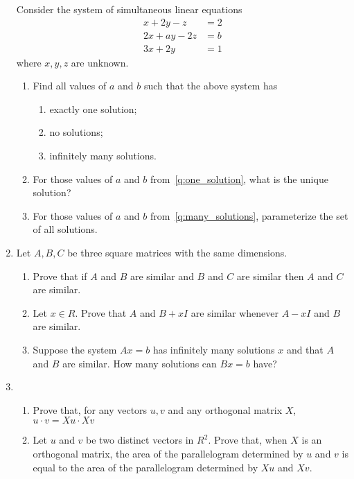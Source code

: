 \documentclass{article}
\begin{document}
\begin{enumerate}
Consider the system of simultaneous linear equations
\begin{align*}
  x + 2y -  z &= 2 \\
 2x + ay - 2z &= b \\
 3x + 2y      &= 1
\end{align*}
where $x, y, z$ are unknown.

\begin{enumerate}
\item Find all values of $a$ and $b$ such that the above system has
\begin{enumerate}
\item \label{q:one_solution} exactly one solution;
\item no solutions;
\item \label{q:many_solutions} infinitely many solutions.
\end{enumerate}
\item For those values of $a$ and $b$ from~\ref{q:one_solution}, what is the
unique solution?
\item For those values of $a$ and $b$ from~\ref{q:many_solutions},
 parameterize the set of all solutions.
\end{enumerate}

\item 
Let $A, B, C$ be three square matrices with the same dimensions.
\begin{enumerate}
\item Prove that if $A$ and $B$ are similar and $B$ and $C$ are similar then 
$A$ and $C$ are similar.
\item Let $x \in R$.  Prove that $A$ and $B + xI$ are similar whenever
$A - xI$ and $B$ are similar.
\item Suppose the system $Ax = b$ has infinitely many solutions $x$ and that
$A$ and $B$ are similar.  How many solutions can $Bx = b$ have?
\end{enumerate}

\item 

\begin{enumerate}
\item Prove that, for any vectors $u, v$ and any orthogonal matrix $X$, $u 
\cdot v = Xu \cdot Xv$
\item Let $u$ and $v$ be two distinct vectors in $R^{2}$.  Prove that, when 
$X$ is an orthogonal matrix, the area of the parallelogram determined by $u$ 
and $v$ is equal to the area of the parallelogram determined by $Xu$ and 
$Xv$.
\end{enumerate}


\end{enumerate}
\end{document}
